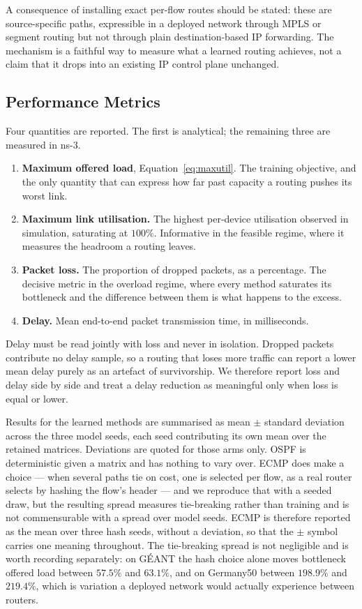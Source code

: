 A consequence of installing exact per-flow routes should be stated: these are
source-specific paths, expressible in a deployed network through MPLS or segment
routing but not through plain destination-based IP forwarding. The mechanism is a
faithful way to measure what a learned routing achieves, not a claim that it
drops into an existing IP control plane unchanged.

\subsection{Performance Metrics}
\label{sec:setup-metrics}

Four quantities are reported. The first is analytical; the remaining three are
measured in ns-3.

\begin{enumerate}
  \item \textbf{Maximum offered load}, Equation~\eqref{eq:maxutil}. The training
    objective, and the only quantity that can express how far past capacity a
    routing pushes its worst link.
  \item \textbf{Maximum link utilisation.} The highest per-device utilisation
    observed in simulation, saturating at $100\%$. Informative in the feasible
    regime, where it measures the headroom a routing leaves.
  \item \textbf{Packet loss.} The proportion of dropped packets, as a percentage.
    The decisive metric in the overload regime, where every method saturates its
    bottleneck and the difference between them is what happens to the excess.
  \item \textbf{Delay.} Mean end-to-end packet transmission time, in
    milliseconds.
\end{enumerate}

Delay must be read jointly with loss and never in isolation. Dropped packets
contribute no delay sample, so a routing that loses more traffic can report a
lower mean delay purely as an artefact of survivorship. We therefore report loss
and delay side by side and treat a delay reduction as meaningful only when loss is
equal or lower.

Results for the learned methods are summarised as mean $\pm$ standard deviation
across the three model seeds, each seed contributing its own mean over the
retained matrices. Deviations are quoted for those arms only. OSPF is
deterministic given a matrix and has nothing to vary over. ECMP does make a
choice --- when several paths tie on cost, one is selected per flow, as a real
router selects by hashing the flow's header --- and we reproduce that with a
seeded draw, but the resulting spread measures tie-breaking rather than training
and is not commensurable with a spread over model seeds. ECMP is therefore
reported as the mean over three hash seeds, without a deviation, so that the
$\pm$ symbol carries one meaning throughout. The tie-breaking spread is not
negligible and is worth recording separately: on GÉANT the hash choice alone
moves bottleneck offered load between $57.5\%$ and $63.1\%$, and on Germany50
between $198.9\%$ and $219.4\%$, which is variation a deployed network would
actually experience between routers.

